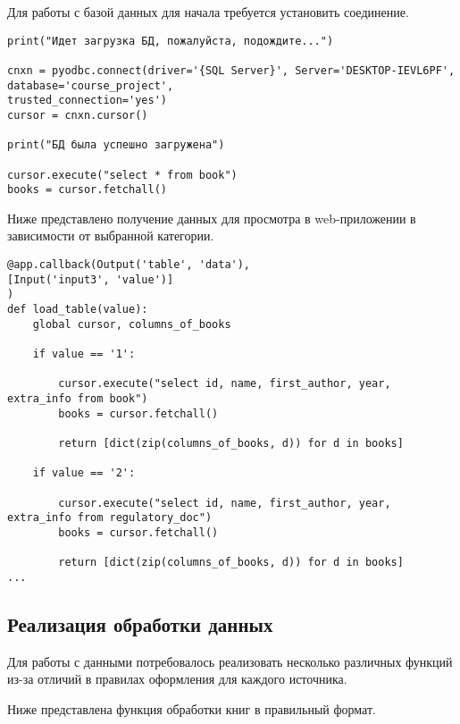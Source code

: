 Для работы с базой данных для начала требуется установить соединение.

\begin{lstlisting}[label=some-code1, caption=Подключение к БД]
print("Идет загрузка БД, пожалуйста, подождите...")

cnxn = pyodbc.connect(driver='{SQL Server}', Server='DESKTOP-IEVL6PF', database='course_project',
trusted_connection='yes')
cursor = cnxn.cursor()

print("БД была успешно загружена")

cursor.execute("select * from book")
books = cursor.fetchall()
\end{lstlisting}

Ниже представлено получение данных для просмотра в web-приложении в зависимости от выбранной категории.
\begin{lstlisting}[label=some-code2, caption=Получение данных из таблиц]
@app.callback(Output('table', 'data'),
[Input('input3', 'value')]
)
def load_table(value):
	global cursor, columns_of_books

	if value == '1':

		cursor.execute("select id, name, first_author, year, extra_info from book")
		books = cursor.fetchall()
		
		return [dict(zip(columns_of_books, d)) for d in books]

	if value == '2':

		cursor.execute("select id, name, first_author, year, extra_info from regulatory_doc")
		books = cursor.fetchall()

		return [dict(zip(columns_of_books, d)) for d in books]
...
\end{lstlisting}

\subsection*{Реализация обработки данных}%

Для работы с данными потребовалось реализовать несколько различных функций из-за отличий в правилах оформления для каждого источника.

Ниже представлена функция обработки книг в правильный формат.

